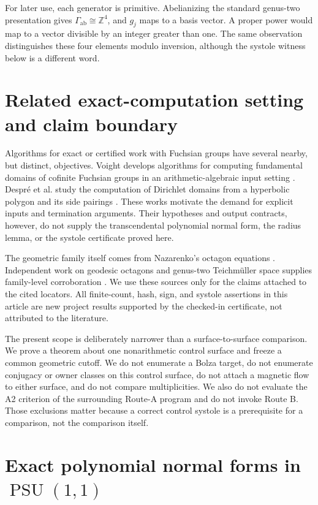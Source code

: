 \documentclass[11pt,a4paper]{article}
\theoremstyle{definition}
\newcommand{\Z}{\mathbb Z}
\newcommand{\PSU}{\operatorname{PSU}}
\begin{document}
For later use, each generator is primitive.  Abelianizing the standard
genus-two presentation gives \(\Gamma_{\mathrm{ab}}\cong\Z^4\), and \(g_j\)
maps to a basis vector.  A proper power would map to a vector divisible by an
integer greater than one.  The same observation distinguishes these four
elements modulo inversion, although the systole witness below is a different
word.

\section{Related exact-computation setting and claim boundary}

Algorithms for exact or certified work with Fuchsian groups have several
nearby, but distinct, objectives.  Voight develops algorithms for computing
fundamental domains of cofinite Fuchsian groups in an arithmetic-algebraic
input setting \cite[Secs.~1--4]{Voight2009}.  Despr\'{e} et al. study the
computation of Dirichlet domains from a hyperbolic polygon and its side
pairings \cite[Secs.~2--3]{DespreEtAl2023}.  These works motivate the demand
for explicit inputs and termination arguments.  Their hypotheses and output
contracts, however, do not supply the transcendental polynomial normal form,
the radius lemma, or the systole certificate proved here.

The geometric family itself comes from Nazarenko's octagon equations
\cite[eqs.~(10)--(18)]{Nazarenko2013}.  Independent work on geodesic
octagons and genus-two Teichm{\"u}ller space supplies family-level
corroboration \cite[abstract]{AigonDupuyEtAl2005}.  We use these sources only for the
claims attached to the cited locators.  All finite-count, hash, sign, and
systole assertions in this article are new project results supported by the
checked-in certificate, not attributed to the literature.

The present scope is deliberately narrower than a surface-to-surface
comparison.  We prove a theorem about one nonarithmetic control surface and
freeze a common geometric cutoff.  We do not enumerate a Bolza target, do not
enumerate conjugacy or owner classes on this control surface, do not attach a
magnetic flow to either surface, and do not compare multiplicities.  We also
do not evaluate the A2 criterion of the surrounding Route-A program and do
not invoke Route B.  Those exclusions matter because a correct control
systole is a prerequisite for a comparison, not the comparison itself.

\section{Exact polynomial normal forms in \texorpdfstring{\(\PSU(1,1)\)}{PSU(1,1)}}
\label{sec:normal-form}
\end{document}
